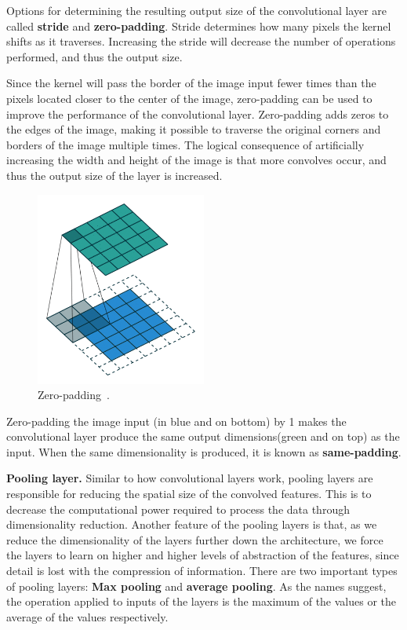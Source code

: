 \documentclass[oneside, english, bibtex]{kththesis}
\begin{document}
Options for determining the resulting output size of the convolutional layer are called \textbf{stride} and \textbf{zero-padding}. Stride determines how many pixels the kernel shifts as it traverses. Increasing the stride will decrease the number of operations performed, and thus the output size.

Since the kernel will pass the border of the image input fewer times than the pixels located closer to the center of the image, zero-padding can be used to improve the performance of the convolutional layer. Zero-padding adds zeros to the edges of the image, making it possible to traverse the original corners and borders of the image multiple times. The logical consequence of artificially increasing the width and height of the image is that more convolves occur, and thus the output size of the layer is increased.

\begin{figure}[H]
  \begin{center}
    \includegraphics[width=0.5\textwidth]{figures/padding.png}
  \end{center}
  \caption{Zero-padding~\cite{Kang2020DeepCN}.}
  \label{fig:padding}
\end{figure}

\begin{center}
Zero-padding the image input (in blue and on bottom) by 1 makes the convolutional layer produce the same output dimensions(green and on top) as the input. When the same dimensionality is produced, it is known as \textbf{same-padding}.
\end{center}

\textbf{Pooling layer.} Similar to how convolutional layers work, pooling layers are responsible for reducing the spatial size of the convolved features. This is to decrease the computational power required to process the data through dimensionality reduction. Another feature of the pooling layers is that, as we reduce the dimensionality of the layers further down the architecture, we force the layers to learn on higher and higher levels of abstraction of the features, since detail is lost with the compression of information. There are two important types of pooling layers: \textbf{Max pooling} and \textbf{average pooling}. As the names suggest, the operation applied to inputs of the layers is the maximum of the values or the average of the values respectively.
\end{document}
